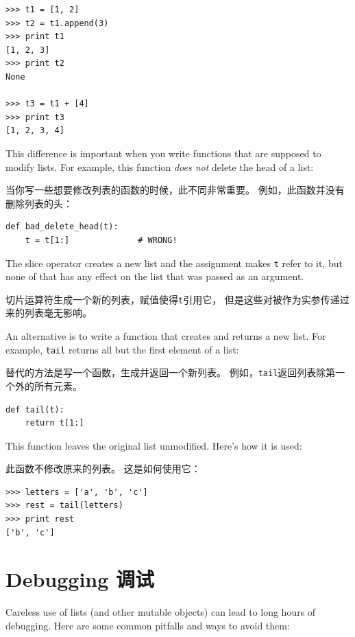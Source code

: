 \documentclass[10pt]{book}
\begin{document}
\begin{CJK}{UTF8}{gbsn}
\begin{verbatim}
>>> t1 = [1, 2]
>>> t2 = t1.append(3)
>>> print t1
[1, 2, 3]
>>> print t2
None

>>> t3 = t1 + [4]
>>> print t3
[1, 2, 3, 4]
\end{verbatim}

This difference is important when you write functions that
are supposed to modify lists.  For example, this function
{\em does not} delete the head of a list:

当你写一些想要修改列表的函数的时候，此不同非常重要。
例如，此函数并没有删除列表的头：

\begin{verbatim}
def bad_delete_head(t):
    t = t[1:]              # WRONG!
\end{verbatim}

The slice operator creates a new list and the assignment
makes {\tt t} refer to it, but none of that has any effect
on the list that was passed as an argument.

切片运算符生成一个新的列表，赋值使得{\tt t}引用它，
但是这些对被作为实参传递过来的列表毫无影响。

An alternative is to write a function that creates and
returns a new list.  For
example, {\tt tail} returns all but the first
element of a list:

替代的方法是写一个函数，生成并返回一个新列表。
例如，{\tt tail}返回列表除第一个外的所有元素。

\begin{verbatim}
def tail(t):
    return t[1:]
\end{verbatim}
%
This function leaves the original list unmodified.
Here's how it is used:

此函数不修改原来的列表。
这是如何使用它：

\begin{verbatim}
>>> letters = ['a', 'b', 'c']
>>> rest = tail(letters)
>>> print rest
['b', 'c']
\end{verbatim}



\section{Debugging 调试}

Careless use of lists (and other mutable objects)
can lead to long hours of debugging.  Here are some common
pitfalls and ways to avoid them:


\end{CJK}
\end{document}
